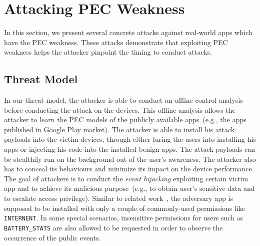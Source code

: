 \section{Attacking PEC Weakness}


In this section, we present several concrete attacks against real-world apps which have the PEC weakness. 
These attacks demonstrate that exploiting PEC weakness helps the attacker pinpoint the timing to conduct attacks. 


\subsection{Threat Model} \label{subsec:threat}

In our threat model, the attacker is able to conduct an offline control analysis before conducting the attack on the devices. 
This offline analysis allows the attacker to learn the PEC models of the publicly available apps~(e.g., the apps published in Google Play market). 
The attacker is able to install his attack payloads into the victim devices, through either luring the users into installing his apps or injecting his code into 
the installed benign apps. 
The attack payloads can be stealthily run on the background out of the user's awareness. 
The attacker also has to conceal its behaviours and minimize its impact on the device performance. 
The goal of attackers is to conduct the \emph{event hijacking} exploiting certain victim app 
and to achieve its malicious purpose~(e.g., to obtain user's sensitive data and to escalate access privilege). 
Similar to related work~\cite{chen2014peeking,ren2015towards}, 
the adversary app is supposed to be installed 
with only a couple of commonly-used permissions like \texttt{INTERNENT}. 
In some special scenarios, insensitive permissions for users such as \texttt{BATTERY\_STATS} are also allowed to be requested in order to 
observe the occurrence of the public events.  



